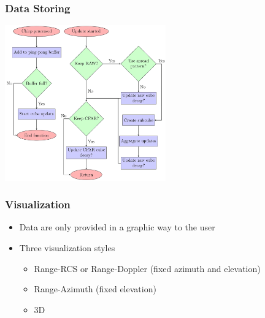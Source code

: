 \documentclass[aspectratio=169]{beamer}
\begin{document}
\begin{frame}[fragile]
  \frametitle{Data Storing}
  \begin{center}
    \includegraphics[width=0.52\textwidth]{../img/dataflow_3.png}
  \end{center}
\end{frame}

\begin{frame}[fragile]
  \frametitle{Visualization}
  \begin{itemize}
    \item Data are only provided in a graphic way to the user
    \item Three visualization styles
      \begin{itemize}
				\item Range-RCS or Range-Doppler (fixed azimuth and elevation)
				\item Range-Azimuth (fixed elevation)
        \item 3D
      \end{itemize}
  \end{itemize}
\end{frame}
\end{document}
